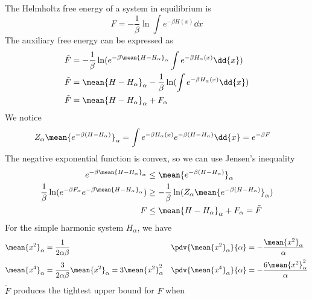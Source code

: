 \documentclass[12pt]{article}
\begin{document}
     \subsection{} The Helmholtz free energy of a system in equilibrium is 
    \[
        F = - \frac{1}{\beta}\ln\int e^{ -\beta H(x)} \dd{x}
    \]
    The auxiliary free energy can be expressed as
    \begin{align*}
        \tilde{F} &=  - \frac{1}{\beta}\ln( e^{ - \beta \mean{H - H_\alpha}_\alpha}\int e^{ -\beta H_\alpha(x)} \dd{x})\\
        \tilde{F} &=  \mean{H - H_\alpha}_\alpha - \frac{1}{\beta}\ln( \int e^{ -\beta H_\alpha(x)} \dd{x})\\
        \tilde{F} &=  \mean{H - H_\alpha}_\alpha + F_\alpha
    \end{align*}
    We notice
    \begin{align*}
        Z_\alpha \mean{e^{ - \beta(H - H_\alpha)}}_\alpha &= \int e^{ -\beta H_\alpha(x)} e^{ - \beta(H - H_\alpha)} \dd{x} = e^{ - \beta F}
    \end{align*}
    The negative exponential function is convex, so we can use Jensen's inequality \begin{align*}
        e^{ - \beta \mean{H - H_\alpha}_\alpha} &\leq \mean{e^{ - \beta(H - H_\alpha)}}_\alpha\\
        \frac{1}{\beta}\ln(e^{ - \beta F_\alpha}e^{ - \beta \mean{H - H_\alpha}_\alpha}) &\geq -\frac{1}{\beta}\ln(Z_\alpha\mean{e^{ - \beta(H - H_\alpha)}}_\alpha) \\
        F &\leq \mean{H - H_\alpha}_\alpha + F_\alpha = \tilde{F}
    \end{align*}
    For the simple harmonic system \(H_\alpha\), we have \begin{align*}
        \mean{x^2}_\alpha &= \frac{1}{2\alpha\beta} &
        \pdv{\mean{x^2}_\alpha}{\alpha} &= -\frac{\mean{x^2}_\alpha}{\alpha} \\
        \mean{x^4}_\alpha &= \frac{3}{2\alpha\beta}\mean{x^2}_\alpha = 3 \mean{x^2}^2_\alpha&
        \pdv{\mean{x^4}_\alpha}{\alpha} &= -\frac{6\mean{x^2}_\alpha^2}{\alpha} 
    \end{align*}
    \(\tilde{F}\) produces the tightest upper bound for \(F\) when
\end{document}
